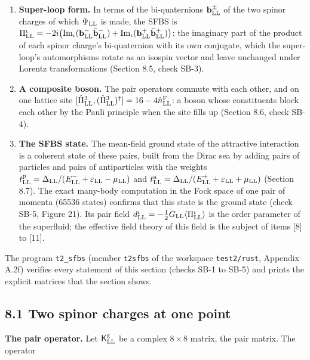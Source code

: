 \documentclass[
  10pt,
]{article}
\begin{document}
\begin{enumerate}
\item
  \textbf{Super-loop form.} In terms of the bi-quaternions
  \(\mathbf b^\pm_{\rm LL}\) of the two spinor charges of which
  \(\Psi_{\rm LL}\) is made, the SFBS is
  \(\Pi^\iota_{\rm LL}=-2i\big({\rm Im}_\iota(\mathbf b^-_{\rm LL}\bar{\mathbf b}^-_{\rm LL})+{\rm Im}_\iota(\mathbf b^+_{\rm LL}\bar{\mathbf b}^+_{\rm LL})\big)\):
  the imaginary part of the product of each spinor charge's
  bi-quaternion with its own conjugate, which the super-loop's
  automorphisms rotate as an isospin vector and leave unchanged under
  Lorentz transformations (Section 8.5, check SB-3).
\item
  \textbf{A composite boson.} The pair operators commute with each
  other, and on one lattice site
  \([\hat\Pi^3_{\rm LL},(\hat\Pi^3_{\rm LL})^\dagger]=16-4\hat n^{\rm F}_{\rm LL}\):
  a boson whose constituents block each other by the Pauli principle
  when the site fills up (Section 8.6, check SB-4).
\item
  \textbf{The SFBS state.} The mean-field ground state of the attractive
  interaction is a coherent state of these pairs, built from the Dirac
  sea by adding pairs of particles and pairs of antiparticles with the
  weights
  \(t^{\rm p}_{\rm LL}=\Delta_{\rm LL}/(E^-_{\rm LL}+\varepsilon_{\rm LL}-\mu_{\rm LL})\)
  and
  \(t^{\rm a}_{\rm LL}=\Delta_{\rm LL}/(E^+_{\rm LL}+\varepsilon_{\rm LL}+\mu_{\rm LL})\)
  (Section 8.7). The exact many-body computation in the Fock space of
  one pair of momenta (65536 states) confirms that this state is the
  ground state (check SB-5, Figure 21). Its pair field
  \(d^\iota_{\rm LL}=-\tfrac12G_{\rm LL}\langle\Pi^\iota_{\rm LL}\rangle\)
  is the order parameter of the superfluid; the effective field theory
  of this field is the subject of items {[}8{]} to {[}11{]}.
\end{enumerate}

The program \texttt{t2\_sfbs} (member \texttt{t2sfbs} of the workspace
\texttt{test2/rust}, Appendix A.2f) verifies every statement of this
section (checks SB-1 to SB-5) and prints the explicit matrices that the
section shows.

\hypertarget{two-spinor-charges-at-one-point}{%
\subsection{8.1 Two spinor charges at one
point}\label{two-spinor-charges-at-one-point}}

\textbf{The pair operator.} Let \(\mathsf K^{\rm g}_{\rm LL}\) be a
complex \(8\times8\) matrix, the pair matrix. The operator
\end{document}
